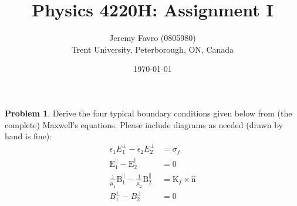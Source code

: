 \documentclass[10pt]{article}
\title{Physics 4220H: Assignment I}
\author{Jeremy Favro (0805980) \\ Trent University, Peterborough, ON, Canada}
\date{\today}
\theoremstyle{definition}
\newtheorem{problem}{Problem}
\newcommand{\uv}[1]{\hat{\bv{{#1}}}}
\newcommand{\bv}[1]{\bm{\mathrm{#1}}}
\begin{document}
\maketitle

\begin{problem}
Derive the four typical boundary conditions given below from (the complete)
Maxwell's equations. Please include diagrams as needed (drawn by hand is fine):
\begin{align*}
  \epsilon_1E_1^\perp-\epsilon_2E_2^\perp                             & =\sigma_f             \\
  \bv{E}_1^\parallel-\bv{E}_2^\parallel                               & =\bv{0}               \\
  \frac{1}{\mu_1}\bv{B}_1^\parallel-\frac{1}{\mu_2}\bv{B}_2^\parallel & =\bv{K}_f\times\uv{n} \\
  B_1^\perp-B_2^\perp                                                 & =0
\end{align*}
\end{problem}
\end{document}
